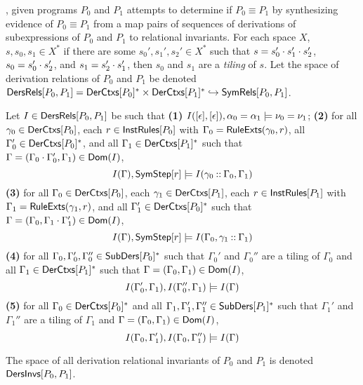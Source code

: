 \sys, given programs $P_0$ and $P_1$ attempts to determine if $P_0
\equiv P_1$ by synthesizing evidence of $P_0 \equiv P_1$ from a map
pairs of sequences of derivations of subexpressions of $P_0$ and $P_1$
to relational invariants.
For each space $X$, $s, s_0, s_1 \in X^{*}$ if there are some $s_0',
s_1', s_2' \in X^{*}$ such that $s = s_0' \cdot s_1' \cdot s_2'$,
$s_0 = s_0' \cdot s_2'$, and $s_1 = s_2' \cdot s_1'$, then $s_0$
and $s_1$ are a \emph{tiling} of $s$.
%
Let the space of derivation relations of $P_0$ and $P_1$ be denoted
$\mathsf{DersRels}[  P_0 ,  P_1  ] = \mathsf{DerCtxs}[ P_0 ]^{*} \times
\mathsf{DerCtxs}[ P_1 ]^{*} \hookrightarrow \mathsf{SymRels}[ P_0, P_1 ]$.
%
\begin{defn}
  \label{defn:der-invs}
  Let $I \in \mathsf{DersRels}[  P_0 ,  P_1  ] $ be such that
  \textbf{(1)} $I([ \epsilon ], [ \epsilon ]), \alpha_0 = \alpha_1
  \models \nu_0 = \nu_1$;
  \textbf{(2)} for all $\gamma_0 \in \mathsf{DerCtxs}[  P_0  ]$, %
  each $r \in \mathsf{InstRules}[  P_0  ]$ with $\Gamma_0 = \mathsf{RuleExts}( \gamma_0,
  r) $, %
  all $\Gamma_0' \in \mathsf{DerCtxs}[  P_0  ]^{*}$, and %
  all $\Gamma_1 \in \mathsf{DerCtxs}[ P_1 ]^{*}$ such that $\Gamma = (\Gamma_0
  \cdot \Gamma_0', \Gamma_1) \in \mathsf{Dom}(I)$,
  \[ I(\Gamma), \symstep{ r } \entails %
  I( \gamma_0 \cons \Gamma_0, \Gamma_1) \]
  \textbf{(3)} for all $\Gamma_0 \in \mathsf{DerCtxs}[  P_0  ]$, %
  each $\gamma_1 \in \mathsf{DerCtxs}[  P_1  ]$, %
  each $r \in \mathsf{InstRules}[  P_1  ]$ with $\Gamma_1 = \mathsf{RuleExts}( \gamma_1,
  r)$, and %
  all $\Gamma_1' \in \mathsf{DerCtxs}[  P_0  ]^{*}$ such that $\Gamma =
  (\Gamma_0, \Gamma_1 \cdot \Gamma_1') \in \mathsf{Dom}(I)$,
  \[ I(\Gamma), \symstep{ r } \entails %
  I( \Gamma_0, \gamma_1 \cons \Gamma_1) \]
  \textbf{(4)} for all $\Gamma_0, \Gamma_0', \Gamma_0'' \in
  \mathsf{SubDers}[ P_0 ]^{*}$ such that $\Gamma_0'$ and $\Gamma_0''$ are a
  tiling of $\Gamma_0$ and all $\Gamma_1 \in \mathsf{DerCtxs}[ P_1 ]^{*}$ such
  that $\Gamma = (\Gamma_0, \Gamma_1) \in \mathsf{Dom}(I)$,
  \[ I(\Gamma_0', \Gamma_1), I(\Gamma_0'', \Gamma_1) \entails %
  I(\Gamma) \]
  \textbf{(5)} for all $\Gamma_0 \in \mathsf{DerCtxs}[ P_0 ]^{*}$ and %
  all $\Gamma_1, \Gamma_1', \Gamma_1'' \in \mathsf{SubDers}[ P_1 ]^{*}$ such
  that $\Gamma_1'$ and $\Gamma_1''$ are a tiling of $\Gamma_1$ and
  $\Gamma = (\Gamma_0, \Gamma_1) \in \mathsf{Dom}(I)$,
  \[ I(\Gamma_0, \Gamma_1'), I(\Gamma_0, \Gamma_1'') \entails %
  I(\Gamma) \]
\end{defn}
%
The space of all derivation relational invariants of $P_0$ and $P_1$
is denoted $\mathsf{DersInvs}[  P_0 ,  P_1  ]$.
%

